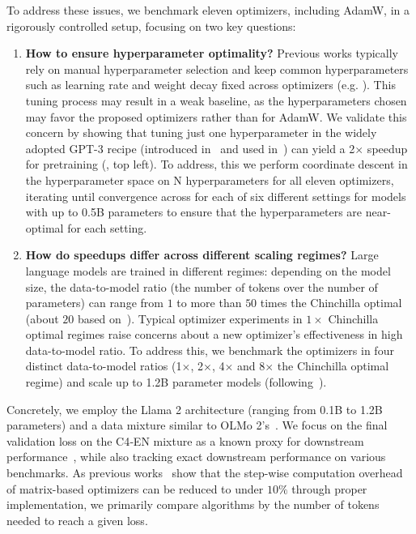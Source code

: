 To address these issues, we benchmark eleven optimizers, including AdamW, in a rigorously controlled setup, focusing on two key questions:
\begin{enumerate}[leftmargin=*]
  \item \textbf{How to ensure hyperparameter optimality?} Previous works typically rely on manual hyperparameter selection and keep common hyperparameters such as learning rate and weight decay fixed across optimizers (e.g. \cite{liu2025muonscalablellmtraining}). This tuning process may result in a weak baseline, as the hyperparameters chosen may favor the proposed optimizers rather than for AdamW. We validate this concern by showing that tuning just one hyperparameter in the widely adopted GPT-3 recipe (introduced in~\cite{brown2020languagemodelsfewshotlearners} and used in~\cite{liu2024sophiascalablestochasticsecondorder,wen2024understandingwarmupstabledecaylearningrates,yuan2025mars,liu2025physicsskilllearning,liu2025focusorderconcentratedupdating,liang2025cautious,wang2025sharpnessdisparityprincipletransformers}) can yield a 2$\times$ speedup for pretraining (, top left). To address, this we perform coordinate descent in the hyperparameter space on N hyperparameters for all eleven optimizers, iterating until convergence across for each of six different settings for models with up to 0.5B parameters to ensure that the hyperparameters are near-optimal for each setting.
  \item \textbf{How do speedups differ across different scaling regimes?} Large language models are trained in different regimes: depending on the model size, the data-to-model ratio (the number of tokens over the number of parameters) can range from $1$ to more than $50$ times the Chinchilla optimal (about $20$ based on~\cite{hoffmann2022trainingcomputeoptimallargelanguage}). Typical optimizer experiments in $1\times$ Chinchilla optimal regimes raise concerns about a new optimizer's effectiveness in high data-to-model ratio. To address this, we benchmark the optimizers in four distinct data-to-model ratios (1$\times$, 2$\times$, 4$\times$ and 8$\times$ the Chinchilla optimal regime) and scale up to  1.2B parameter models (following~\cite{everett2024scalingexponentsparameterizationsoptimizers,zhang2025doescriticalbatchsize}).
\end{enumerate}

Concretely, we employ the Llama 2 architecture \cite{touvron2023llama2openfoundation,grattafiori2024llama3herdmodels} 
(ranging from 0.1B to 1.2B parameters) and a data mixture similar to OLMo 2's~\cite{olmo20252olmo2furious}. We focus on the final validation loss on the C4‐EN mixture as a known proxy for downstream performance~\cite{bhagia2024establishingtaskscalinglaws}, while also tracking exact downstream performance on various benchmarks. As previous works~\cite{vyas2025soapimprovingstabilizingshampoo,liu2025muonscalablellmtraining} show that the step-wise computation overhead of matrix-based optimizers can be reduced to under $10\%$ through proper implementation, we primarily compare algorithms by the number of tokens needed to reach a given loss.

